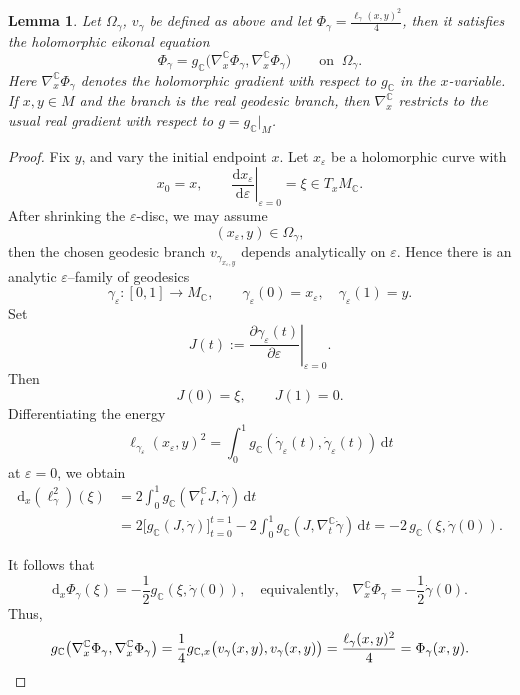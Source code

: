 \documentclass[11pt]{amsart}
\theoremstyle{plain}
\newtheorem{lem}[thm]{Lemma}
\theoremstyle{definition}
\newcommand{\C}{\mathbb{C}}
\newcommand{\dd}{\mathrm d}
\begin{document}
\begin{lem}\label{lem:eikonal-equation}
Let $\Omega_{\gamma}$, $v_{\gamma}$ be defined as above and let $\Phi_\gamma=\frac{\ell_{\gamma}(x,y)^2}{4}$, then it satisfies the holomorphic eikonal equation
\[
\Phi_\gamma=g_{\mathbb C}\bigl(\nabla_x^{\mathbb C}\Phi_\gamma,\nabla_x^{\mathbb C}\Phi_\gamma\bigr)
\qquad\text{on }~ \Omega_\gamma.
\]
Here $\nabla_x^{\mathbb C}\Phi_\gamma$ denotes the holomorphic gradient
with respect to $g_{\mathbb C}$ in the
$x$-variable. %
If $x,y\in M$ and
the branch is the real geodesic branch, then
$\nabla_x^{\mathbb C}$ restricts to the usual real gradient with respect to $g=g_{\mathbb C}|_M$.
\end{lem}



\begin{proof}
Fix $y$, and vary the initial endpoint $x$.  Let
$x_\varepsilon$ be a holomorphic curve with
\[
x_0=x, \qquad \left.\frac{\dd x_\varepsilon}{\dd\varepsilon}\right|_{\varepsilon=0}=\xi \in T_xM_{\C}.
\]
After shrinking the $\varepsilon$-disc, we may assume
\[
(x_\varepsilon,y)\in \Omega_\gamma,
\] 
then the chosen geodesic branch $v_{\gamma_{x_{\varepsilon},y}}$ depends
analytically on $\varepsilon$.  Hence there is an analytic $\varepsilon$--family of
geodesics
\[
\gamma_\varepsilon:[0,1]\to M_{\C},\qquad
\gamma_\varepsilon(0)=x_\varepsilon,\quad\gamma_\varepsilon(1)=y .
\]
Set
\[
J(t):=\left.\frac{\partial \gamma_\varepsilon(t)}
{\partial \varepsilon}\right|_{\varepsilon=0}.
\]
Then
\[
J(0)=\xi, \qquad J(1)=0.
\]
Differentiating the energy
\[
\ell_{\gamma_\varepsilon}(x_\varepsilon,y)^2=\int_0^1
g_{\C}(\dot\gamma_\varepsilon(t),
\dot\gamma_\varepsilon(t))\,\dd t
\]
at $\varepsilon=0$, we obtain
\begin{align*}
  \dd_x(\ell_\gamma^2)(\xi)
&=2\int_0^1g_{\C}(\nabla_t^{\C} J,\dot\gamma)\,\dd t  \\
&=2\Big[g_{\C}(J,\dot\gamma)
\Big]_{t=0}^{t=1}-2\int_0^1g_{\C}(J,\nabla_t^{\C}\dot\gamma)\,\dd t =-2\,g_{\C}(\xi,\dot\gamma(0)).
\end{align*}

It follows that
\[
\dd_x\Phi_\gamma(\xi)
=-\frac12 g_{\C}(\xi,\dot\gamma(0)),\quad\text{
equivalently,}\quad
\nabla_x^{\C}\Phi_\gamma=-\frac12 \dot\gamma(0).
\]
Thus,
\[
g_{\mathbb C}\bigl(\nabla_x^{\mathbb C}\Phi_\gamma,
\nabla_x^{\mathbb C}\Phi_\gamma\bigr)
=\frac14 g_{\mathbb C,x}\bigl(v_\gamma(x,y),v_\gamma(x,y)\bigr)
=\frac{\ell_\gamma(x,y)^2}{4}=\Phi_\gamma(x,y).\qedhere
\]
\end{proof}
\end{document}
